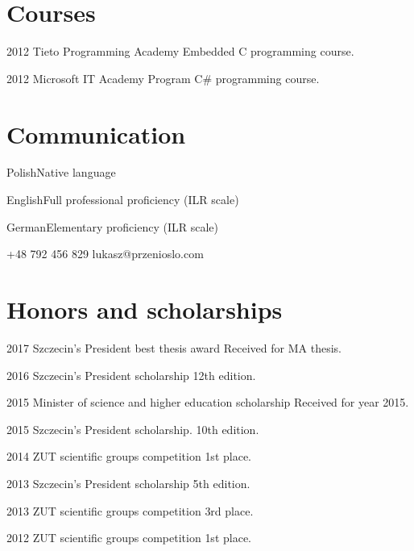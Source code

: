 \documentclass{tccv}
\begin{document}
\section{Courses}

\begin{yearlist}

\item{2012}
     {Tieto Programming Academy}
     {Embedded C programming course.}

\item{2012}
     {Microsoft IT Academy Program }
     {C\# programming course.}

\end{yearlist}

\section{Communication}

\begin{factlist}
\item{Polish}{Native language}
\item{English}{Full professional proficiency (ILR scale)}
\item{German}{Elementary proficiency (ILR scale)}
\end{factlist}

    {+48 792 456 829}
    {lukasz@przenioslo.com}
    
\section{Honors and scholarships}

\begin{yearlist}

\item{2017}
     {Szczecin's President best thesis award}
     {Received for MA thesis.} 

\item{2016}
     {Szczecin's President scholarship}
     {12th edition.} 
     
\item{2015}
     {Minister of science and higher education scholarship}
     {Received for year 2015.} 

\item{2015}
     {Szczecin's President scholarship.}
     {10th edition.} 

\item{2014}
     {ZUT scientific groups competition}
     {1st place.}
     
\item{2013}
     {Szczecin's President scholarship}
     {5th edition.} 

\item{2013}
     {ZUT scientific groups competition}
     {3rd place.}

\item{2012}
     {ZUT scientific groups competition}
     {1st place.}
    
\end{yearlist}
\end{document}
